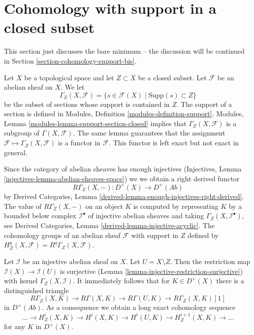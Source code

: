 \section{Cohomology with support in a closed subset}
\label{section-cohomology-support}

\noindent
This section just discusses the bare minimum -- the discussion
will be continued in Section \ref{section-cohomology-support-bis}.

\medskip\noindent
Let $X$ be a topological space and let $Z \subset X$ be a closed subset.
Let $\mathcal{F}$ be an abelian sheaf on $X$. We let
$$
\Gamma_Z(X, \mathcal{F}) =
\{s \in \mathcal{F}(X) \mid \text{Supp}(s) \subset Z\}
$$
be the subset of sections whose support is contained in $Z$.
The support of a section is defined in
Modules, Definition \ref{modules-definition-support}.
Modules, Lemma \ref{modules-lemma-support-section-closed}
implies that $\Gamma_Z(X, \mathcal{F})$ is a subgroup of
$\Gamma(X, \mathcal{F})$. The same lemma guarantees that
the assignment $\mathcal{F} \mapsto \Gamma_Z(X, \mathcal{F})$
is a functor in $\mathcal{F}$.
This functor is left exact but not exact in general.

\medskip\noindent
Since the category of abelian sheaves has enough injectives
(Injectives, Lemma \ref{injectives-lemma-abelian-sheaves-space})
we we obtain a right derived functor
$$
R\Gamma_Z(X, -) : D^+(X) \longrightarrow D^+(\textit{Ab})
$$
by
Derived Categories, Lemma \ref{derived-lemma-enough-injectives-right-derived}.
The value of $R\Gamma_Z(X, -)$ on an object $K$ is computed by representing
$K$ by a bounded below complex $\mathcal{I}^\bullet$ of injective abelian
sheaves and taking $\Gamma_Z(X, \mathcal{I}^\bullet)$, see
Derived Categories, Lemma \ref{derived-lemma-injective-acyclic}.
The cohomology groups of an abelian sheaf $\mathcal{F}$
with support in $Z$ defined by
$H^q_Z(X, \mathcal{F}) = R^q\Gamma_Z(X, \mathcal{F})$.

\medskip\noindent
Let $\mathcal{I}$ be an injective abelian sheaf on $X$. Let
$U = X \setminus Z$. Then the restriction map
$\mathcal{I}(X) \to \mathcal{I}(U)$ is surjective
(Lemma \ref{lemma-injective-restriction-surjective})
with kernel $\Gamma_Z(X, \mathcal{I})$. It immediately follows that
for $K \in D^+(X)$ there is a distinguished triangle
$$
R\Gamma_Z(X, K) \to R\Gamma(X, K) \to R\Gamma(U, K) \to R\Gamma_Z(X, K)[1]
$$
in $D^+(\textit{Ab})$. As a consequence we obtain a long exact cohomology
sequence
$$
\ldots \to H^i_Z(X, K) \to H^i(X, K) \to H^i(U, K) \to
H^{i + 1}_Z(X, K) \to \ldots
$$
for any $K$ in $D^+(X)$.

